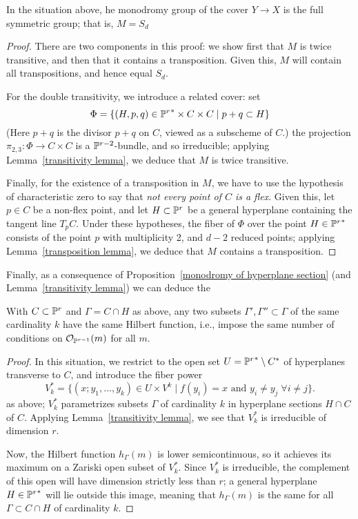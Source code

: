 \begin{proposition}\label{monodromy of hyperplane section}
In the situation above, he monodromy group of the cover $Y \to X$ is the full symmetric group; that is, $M = S_d$
\end{proposition}

\begin{proof}
There are two components in this proof: we show first that $M$ is twice transitive, and then that it contains a transposition. Given this, $M$ will contain all transpositions, and hence equal $S_d$.

For the double transitivity, we introduce a related cover: set
$$
\Phi = \{ (H, p, q) \in {{\mathbb P}^r}^* \times C \times C \mid p + q \subset H \}
$$
(Here $p+q$ is the divisor $p+q$ on $C$, viewed as a subscheme of $C$.) the projection $\pi_{2,3} : \Phi \to C \times C$ is a ${\mathbb P}^{r-2}$-bundle, and so irreducible; applying Lemma~\ref{transitivity lemma}, we deduce that $M$ is twice transitive.

Finally, for the existence of a transposition in $M$, we have to use the hypothesis of characteristic zero to say that \emph{not every point of $C$ is a flex}. Given this, let $p \in C$ be a non-flex point, and let $H \subset {\mathbb P}^r$ be a general hyperplane containing the tangent line $T_pC$. Under these hypotheses, the fiber of $\Phi$ over the point $H \in {{\mathbb P}^r}^*$ consists of the point $p$ with multiplicity 2, and $d-2$ reduced points; applying Lemma~\ref{transposition lemma}, we deduce that $M$ contains a transposition.
\end{proof}

Finally, as a consequence of Proposition~\ref{monodromy of hyperplane section} (and Lemma~\ref{transitivity lemma}) we can deduce the

\begin{lemma}
With $C \subset {\mathbb P}^r$ and $\Gamma = C \cap H$ as above, any two subsets $\Gamma', \Gamma'' \subset \Gamma$ of the same cardinality $k$ have the same Hilbert function, i.e., impose the same number of conditions on ${\mathcal O}_{{\mathbb P}^{r-1}}(m)$ for all $m$.
\end{lemma}

\begin{proof}
In this situation, we restrict to the open set $U = {{\mathbb P}^r}^* \setminus C^*$ of hyperplanes transverse to $C$, and introduce the fiber power
$$
V_k^* = \{ (x; y_1,\dots, y_k) \in U \times V^k \mid f(y_i) = x \text{ and } y_i \neq y_j \; \forall i \neq j\}.
$$
as above; $V_k^*$ parametrizes subsets $\Gamma$ of cardinality $k$ in hyperplane sections $H \cap C$ of $C$. Applying Lemma~\ref{transitivity lemma}, we see that $V_k^*$ is irreducible of dimension $r$. 

Now, the Hilbert function $h_\Gamma(m)$ is lower semicontinuous, so it achieves its maximum on a Zariski open subset of $V_k^*$. Since $V_k^*$ is irreducible, the complement of this open will have dimension strictly less than $r$;  a general hyperplane $H \in {{\mathbb P}^r}^*$ will lie outside this image, meaning that $h_\Gamma(m)$ is the same for all $\Gamma \subset C \cap H$ of cardinality $k$.
\end{proof}

